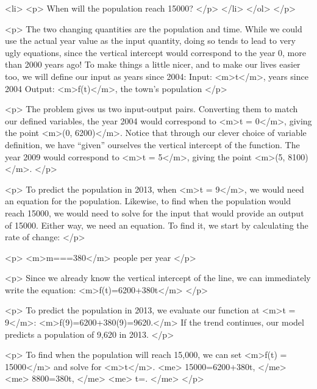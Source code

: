                     <li>
                        <p>
                            When will the population reach 15000?
                        </p>
                    </li>
                </ol>
            </p>

            <p>
                The two changing quantities are the population and time.
                While we could use the actual year value as the input quantity, doing so tends to lead to very ugly equations, since the vertical intercept would correspond to the year 0, more than 2000 years ago! To make things a little nicer, and to make our lives easier too, we will define our input as years since 2004: Input: <m>t</m>, years since 2004 Output: <m>f(t)</m>, the town’s population
            </p>

            <p>
                The problem gives us two input-output pairs.
                Converting them to match our defined variables, the year 2004 would correspond to <m>t = 0</m>, giving the point <m>(0, 6200)</m>.
                Notice that through our clever choice of variable definition, we have “given” ourselves the vertical intercept of the function.
                The year 2009 would correspond to <m>t = 5</m>, giving the point <m>(5, 8100)</m>.
            </p>

            <p>
                To predict the population in 2013, when <m>t = 9</m>, we would need an equation for the population.
                Likewise, to find when the population would reach 15000, we would need to solve for the input that would provide an output of 15000.
                Either way, we need an equation.
                To find it, we start by calculating the rate of change:
            </p>

            <p>
                <m>m===380</m> people per year
            </p>

            <p>
                Since we already know the vertical intercept of the line, we can immediately write the equation: <m>f(t)=6200+380t</m>
            </p>

            <p>
                To predict the population in 2013, we evaluate our function at <m>t = 9</m>: <m>f(9)=6200+380(9)=9620.</m> If the trend continues, our model predicts a population of 9,620 in 2013.
            </p>

            <p>
                To find when the population will reach 15,000, we can set <m>f(t) = 15000</m> and solve for <m>t</m>.
                <me>
                    15000=6200+380t,
                </me>
                <me>
                    8800=380t,
                </me>
                <me>
                    t=.
                </me>
            </p>

